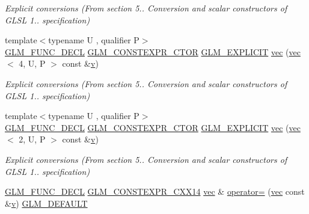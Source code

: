 \begin{DoxyCompactItemize}
\begin{DoxyCompactList}\small\item\em Explicit conversions (From section 5.. Conversion and scalar constructors of G\+L\+SL 1.. specification) \end{DoxyCompactList}\item 
{\footnotesize template$<$typename U , qualifier P$>$ }\\\hyperlink{setup_8hpp_ab2d052de21a70539923e9bcbf6e83a51}{G\+L\+M\+\_\+\+F\+U\+N\+C\+\_\+\+D\+E\+CL} \hyperlink{setup_8hpp_ad34178a09666081abdb573c14d1f4a5a}{G\+L\+M\+\_\+\+C\+O\+N\+S\+T\+E\+X\+P\+R\+\_\+\+C\+T\+OR} \hyperlink{setup_8hpp_a6c74f5a5e7b134ab69023ff9a30d4d5d}{G\+L\+M\+\_\+\+E\+X\+P\+L\+I\+C\+IT} \hyperlink{structglm_1_1vec_3_012_00_01_t_00_01_q_01_4_a2f77cbeba0c2efa024d10e348636c7c1}{vec} (\hyperlink{structglm_1_1vec}{vec}$<$ 4, U, P $>$ const \&\hyperlink{_s_d_l__opengl_8h_a10a82eabcb59d2fcd74acee063775f90}{v})
\begin{DoxyCompactList}\small\item\em Explicit conversions (From section 5.. Conversion and scalar constructors of G\+L\+SL 1.. specification) \end{DoxyCompactList}\item 
{\footnotesize template$<$typename U , qualifier P$>$ }\\\hyperlink{setup_8hpp_ab2d052de21a70539923e9bcbf6e83a51}{G\+L\+M\+\_\+\+F\+U\+N\+C\+\_\+\+D\+E\+CL} \hyperlink{setup_8hpp_ad34178a09666081abdb573c14d1f4a5a}{G\+L\+M\+\_\+\+C\+O\+N\+S\+T\+E\+X\+P\+R\+\_\+\+C\+T\+OR} \hyperlink{setup_8hpp_a6c74f5a5e7b134ab69023ff9a30d4d5d}{G\+L\+M\+\_\+\+E\+X\+P\+L\+I\+C\+IT} \hyperlink{structglm_1_1vec_3_012_00_01_t_00_01_q_01_4_a55d77d8b7320875815bfe34fd59823af}{vec} (\hyperlink{structglm_1_1vec}{vec}$<$ 2, U, P $>$ const \&\hyperlink{_s_d_l__opengl_8h_a10a82eabcb59d2fcd74acee063775f90}{v})
\begin{DoxyCompactList}\small\item\em Explicit conversions (From section 5.. Conversion and scalar constructors of G\+L\+SL 1.. specification) \end{DoxyCompactList}\item 
\hyperlink{setup_8hpp_ab2d052de21a70539923e9bcbf6e83a51}{G\+L\+M\+\_\+\+F\+U\+N\+C\+\_\+\+D\+E\+CL} \hyperlink{setup_8hpp_a4dd12abf5e1164bc57f3a34671d03844}{G\+L\+M\+\_\+\+C\+O\+N\+S\+T\+E\+X\+P\+R\+\_\+\+C\+X\+X14} \hyperlink{structglm_1_1vec}{vec} \& \hyperlink{structglm_1_1vec_3_012_00_01_t_00_01_q_01_4_a1cdeb98b13f93223e04b171b4f5b7d0c}{operator=} (\hyperlink{structglm_1_1vec}{vec} const \&\hyperlink{_s_d_l__opengl_8h_a10a82eabcb59d2fcd74acee063775f90}{v}) \hyperlink{setup_8hpp_aefce7051c376a64ba89fa93a9f63bc2c}{G\+L\+M\+\_\+\+D\+E\+F\+A\+U\+LT}

\end{DoxyCompactItemize}
